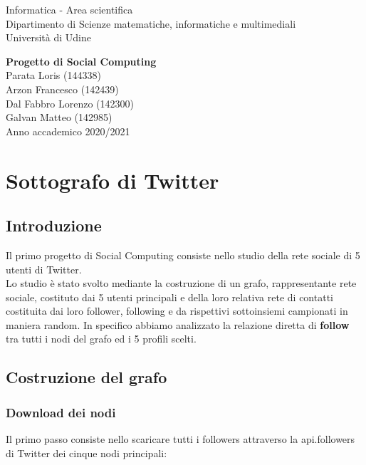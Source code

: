 \documentclass[a4paper,11pt]{report}
\begin{document}
\begin{titlepage}
  \clearpage\thispagestyle{empty}
  \centering
  \vspace{1cm}
  {\normalsize Informatica - Area scientifica \\  Dipartimento di Scienze matematiche, informatiche e multimediali\\  Università di Udine \par}
  \vspace{3cm}
  {\Huge \textbf{Progetto di Social Computing}}\\
  \vspace{4cm}
  {\Large  Parata Loris (144338) \\ Arzon Francesco (142439)\\ Dal Fabbro Lorenzo (142300)\\ Galvan Matteo (142985) \\ }
  \vspace{12cm}
  {\normalsize Anno accademico 2020/2021}
  \pagebreak
\end{titlepage}

\tableofcontents{}
\pagebreak
\chapter{Sottografo di Twitter}
\section{Introduzione}
Il primo progetto di Social Computing consiste nello studio della rete sociale di 5 utenti di Twitter.\\
Lo studio è stato svolto mediante la costruzione di un grafo, rappresentante  rete sociale, costituto dai 5 utenti principali e della loro relativa rete di contatti costituita dai loro follower, following e da rispettivi sottoinsiemi campionati in maniera random.
In specifico abbiamo analizzato la relazione diretta di \textbf{follow} tra tutti i nodi del grafo ed i 5 profili scelti.

\section{Costruzione del grafo}
\subsection{Download dei nodi}
Il primo passo consiste nello scaricare tutti i followers attraverso la api.followers di Twitter dei cinque nodi principali:
\end{document}
